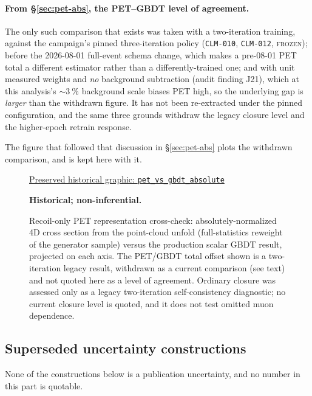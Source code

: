 \paragraph{From \S\ref{sec:pet-abs}, the PET--GBDT level of agreement.} The only such comparison that exists was taken with a two-iteration training, against the campaign's pinned three-iteration policy (\texttt{CLM-010}, \texttt{CLM-012}, \textsc{frozen}); before the 2026-08-01 full-event schema change, which makes a pre-08-01 PET total a different estimator rather than a differently-trained one; and with unit measured weights and \emph{no} background subtraction (audit finding J21), which at this analysis's ${\sim}\SI{3}{\percent}$ background scale biases PET high, so the underlying gap is \emph{larger} than the withdrawn figure. It has not been re-extracted under the pinned configuration, and the same three grounds withdraw the legacy closure level and the higher-epoch retrain response.

The figure that followed that discussion in \S\ref{sec:pet-abs} plots the withdrawn comparison, and is kept here with it.

\begin{figure}[H]
  \centering
  \par\href{https://github.com/josephbaileyy/MINERvA-OmniFold/blob/3892e769043cddebfd58ec19e1ab1a567eb01784/docs/analysis-note/figures/pet_vs_gbdt_absolute.pdf}{Preserved historical graphic: \texttt{pet\_vs\_gbdt\_absolute}} \par\smallskip\textbf{Historical; non-inferential.}
  \caption{Recoil-only PET representation cross-check: absolutely-normalized 4D cross section from the point-cloud unfold (full-statistics reweight of the generator sample) versus the production scalar GBDT result, projected on each axis. The PET/GBDT total offset shown is a two-iteration legacy result, withdrawn as a current comparison (see text) and not quoted here as a level of agreement. Ordinary closure was assessed only as a legacy two-iteration self-consistency diagnostic; no current closure level is quoted, and it does not test omitted muon dependence.}
  \label{fig:petabs}
\end{figure}

\subsection{Superseded uncertainty constructions}
\label{app:history-pet-superseded}

None of the constructions below is a publication uncertainty, and no number in this part is quotable.

